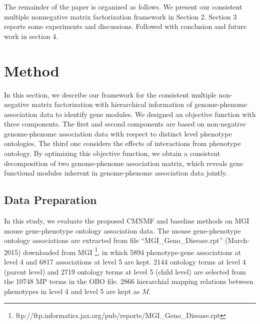 \documentclass{bmcart}
\begin{document}
The remainder of the paper is organized as follows. We present our consistent multiple nonnegative matrix factorization framework in Section 2. Section 3 reports some experiments and discussions. Followed with conclusion and future work in section 4.


\section*{Method}
In this section, we describe our framework for the consistent multiple non-negative matrix
factorization with hierarchical information of genome-phenome association data to identify gene modules.
We designed an objective function with three components. The first and second components are based on non-negative genome-phenome association data with respect to distinct level phenotype ontologies. The third one considers the effects of interactions from phenotype ontology. By optimizing this objective function, we obtain a consistent decomposition of two genome-phenome association matrix, which reveals gene functional modules inherent in genome-phenome association data jointly.

\subsection*{Data Preparation}
In this study, we evaluate the proposed CMNMF and baseline methods on MGI mouse gene-phenotype ontology association data. The mouse gene-phenotype ontology associations are extracted from file ``MGI\_Geno\_Disease.rpt'' (March-2015) downloaded from MGI \footnote[1]{ftp://ftp.informatics.jax.org/pub/reports/MGI\_Geno\_Disease.rpt}, in which 5894 phenotype-gene associations at level 4 and 6817 associations at level 5 are kept. 2144 ontology terms at level 4 (parent level) and 2719 ontology terms at level 5 (child level)  are selected from the 10748 MP terms in the OBO file. 2866 hierarchial mapping relations between phenotypes in level 4 and level 5 are kept as $M$.
\end{document}
